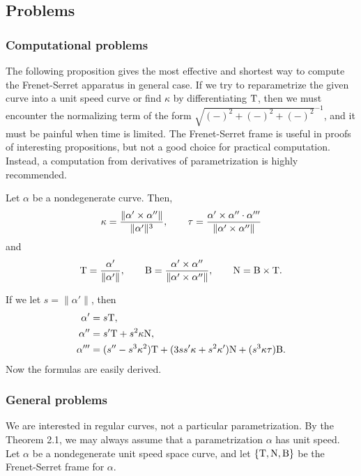 \documentclass{../exp}
\def\a{\alpha}
\begin{document}
\subsection{Problems}



\subsubsection{Computational problems}

The following proposition gives the most effective and shortest way to compute the Frenet-Serret apparatus in general case.
If we try to reparametrize the given curve into a unit speed curve or find $\kappa$ by differentiating $\mathrm{T}$, then we must encounter the normalizing term of the form $\sqrt{(-)^2+(-)^2+(-)^2}^{-1}$, and it must be painful when time is limited.
The Frenet-Serret frame is useful in proofs of interesting propositions, but not a good choice for practical computation.
Instead, a computation from derivatives of parametrization is highly recommended.
\begin{prop}
Let $\a$ be a nondegenerate curve.
Then,
\[\kappa=\frac{\|\a'\x\a''\|}{\|\a'\|^3},\qquad\tau=\frac{\a'\x\a''\cdot\a'''}{\|\a'\x\a''\|}\]
and
\[\rT=\frac{\a'}{\|\a'\|},\qquad\rB=\frac{\a'\x\a''}{\|\a'\x\a''\|},\qquad\rN=\rB\x\rT.\]
\end{prop}
\begin{pf}
If we let $s=\|\a'\|$, then
\begin{align*}
\a'&=s\rT,\\
\a''&=s'\rT+s^2\kappa\rN,\\
\a'''&=(s''-s^3\kappa^2)\rT+(3ss'\kappa+s^2\kappa')\rN+(s^3\kappa\tau)\rB.
\end{align*}
Now the formulas are easily derived.
\end{pf}



\subsubsection{General problems}

We are interested in regular curves, not a particular parametrization.
By the Theorem 2.1, we may always assume that a parametrization $\a$ has unit speed.
Let $\a$ be a nondegenerate unit speed space curve, and let $\{\mathrm{T},\mathrm{N},\mathrm{B}\}$ be the Frenet-Serret frame for $\a$.
\end{document}
